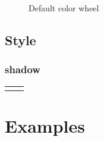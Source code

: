 \documentclass{article}
\newcommand{\demo}[2][1]{
  \begin{center}
  \begin{tabular}{cc}
    \begin{minipage}{.49\linewidth}
      \centering
      \resizebox{#1\linewidth}{!}{
        
      }
    \end{minipage}
    &
    \begin{minipage}{.45\linewidth}
      
    \end{minipage}
  \end{tabular}
  \end{center}
}
\newcommand{\example}[2][1]{
  \begin{center}  
    \resizebox{#1\linewidth}{!}{
      
    }
  \end{center}
  
}
\begin{document}
\begin{figure}
  \centering
  
  \caption{Default color wheel}
  \label{fig:color-wheel}
\end{figure}


\subsection{Style}
\subsubsection{shadow}
\demo[0.6]{shadow}

\section{Examples}


\end{document}
